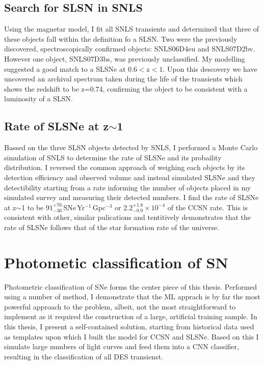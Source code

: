 \subsection{Search for SLSN in SNLS}
Using the magnetar model, I fit all SNLS transients and determined that three of these objects fall within the definition fo a SLSN. Two were the previously discovered, spectroscopically confirmed objects: SNLS06D4eu and SNLS07D2bv. However one object, SNLS07D3bs, was previously unclassified. My modelling suggested a good match to a SLSNe at 0.6$<$z$<1$. Upon this descovery we have uncovered an archival spectrum taken during the life of the transients which shows the redshift to be z=0.74, confirming the object to be consistent with a luminosity of a SLSN.

\subsection{Rate of SLSNe at z$\sim$1}
Bassed on the three SLSN objects detected by SNLS, I performed a Monte Carlo simulation of SNLS to determine the rate of SLSNe and its probaility distribution. I reversed the common approach of weighing each objects by its detection efficiency and observed volume and instead simulated SLSNe and they detectibility starting from a rate informing the number of objects placed in my simulated survey and measuring their detected numbers. I find the rate of SLSNe at z$\sim$1 to be $91^{+76}_{-36}$\,SNe\,Yr$^{-1}$\,Gpc$^{-3}$ or 2.2$^{+1.8}_{-0.9}\times10^{-4}$ of the CCSN rate. This is consistent with other, similar pulications and tentitively demonstrates that the rate of SLSNe follows that of the star formation rate of the universe.

\section{Photometic classification of SN}
Photometric classification of SNe forms the center piece of this thesis. Performed using a number of method, I demonstrate that the ML apprach is by far the most powerful approach to the problem, albeit, not the most straightforward to implement as it required the construction of a large, artificial training sample. In this thesis, I present a self-contained solution, starting from historical data used as templates upon which I built the model for CCSN and SLSNe. Based on this I simulate large numbers of light curves and feed them into a CNN classifier, resulting in the classification of all DES transienst.

